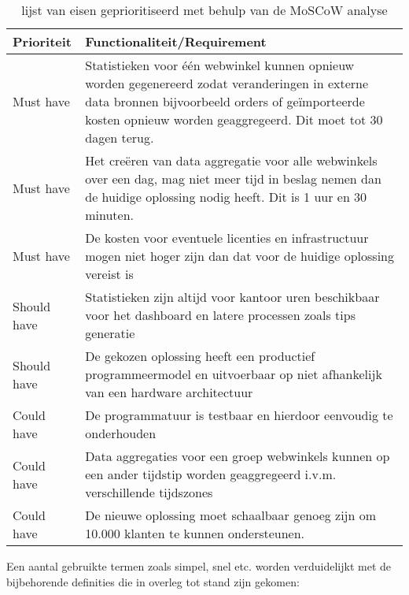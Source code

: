\begin{table}[bh]
\centering
\caption{lijst van eisen geprioritiseerd met behulp van de MoSCoW analyse}
\label{table:requirements}
\def\arraystretch{1.5}

\begin{tabular}{|l|p{12.5cm}|}
\hline
\textbf{Prioriteit} & \textbf{Functionaliteit/Requirement}
\\ \hline
Must have           & Statistieken voor één webwinkel kunnen opnieuw worden gegenereerd zodat veranderingen in externe data bronnen bijvoorbeeld orders of geïmporteerde kosten opnieuw worden geaggregeerd. Dit moet tot 30 dagen terug.
\\ \hline
Must have           & Het creëren van data aggregatie voor alle webwinkels over een dag, mag niet meer tijd in beslag nemen dan de huidige oplossing nodig heeft. Dit is 1 uur en 30 minuten.
\\ \hline
Must have           & De kosten voor eventuele licenties en infrastructuur mogen niet hoger zijn dan dat voor de huidige oplossing vereist is
\\ \hline
Should have         & Statistieken zijn altijd voor kantoor uren beschikbaar voor het dashboard en latere processen zoals tips generatie
\\ \hline
Should have         & De gekozen oplossing heeft een productief programmeermodel en uitvoerbaar op niet afhankelijk van een hardware architectuur
\\ \hline
Could have         & De programmatuur is testbaar en hierdoor eenvoudig te onderhouden
\\ \hline
Could have          & Data aggregaties voor een groep webwinkels kunnen op een ander tijdstip worden geaggregeerd i.v.m. verschillende tijdszones
\\ \hline
Could have         & De nieuwe oplossing moet schaalbaar genoeg zijn om 10.000 klanten te kunnen ondersteunen.
\\ \hline
\end{tabular}
\end{table}

Een aantal gebruikte termen zoals simpel, snel etc. worden verduidelijkt met de bijbehorende definities die in overleg tot stand zijn gekomen:

